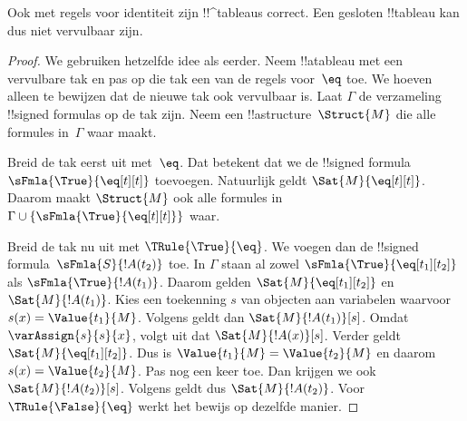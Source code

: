 \documentclass[openany]{memoir}
\begin{document}
\begingroup
\def\olfilename{OLP-0111}
\def\olfilepath{content/first-order-logic/tableaux/}
\hypertarget{unit-OLP-0111}{}





\begin{prop}
Ook met regels voor identiteit zijn !!^{tableau}s correct. Een gesloten
!!{tableau} kan dus niet vervulbaar zijn.
\end{prop}

\begin{proof}
We gebruiken hetzelfde idee als eerder. Neem !!a{tableau} met een
vervulbare tak en pas op die tak een van de regels voor~$\eq$ toe. We
hoeven alleen te bewijzen dat de nieuwe tak ook vervulbaar is. Laat
$\Gamma$ de verzameling !!{signed formula}s op de tak zijn. Neem een
!!a{structure}~$\Struct{M}$ die alle formules in~$\Gamma$ waar maakt.

Breid de tak eerst uit met~$\eq$. Dat betekent dat we de
!!{signed formula}~$\sFmla{\True}{\eq[t][t]}$ toevoegen. Natuurlijk
geldt $\Sat{M}{\eq[t][t]}$. Daarom maakt $\Struct{M}$ ook alle formules
in $\Gamma \cup \{\sFmla{\True}{\eq[t][t]}\}$ waar.

Breid de tak nu uit met $\TRule{\True}{\eq}$. We voegen dan de
!!{signed formula}~$\sFmla{S}{!A(t_2)}$ toe. In $\Gamma$ staan al
zowel $\sFmla{\True}{\eq[t_1][t_2]}$ als
$\sFmla{\True}{!A(t_1)}$. Daarom gelden
$\Sat{M}{\eq[t_1][t_2]}$ en $\Sat{M}{!A(t_1)}$. Kies een toekenning
$s$ van objecten aan variabelen waarvoor
$s(x) = \Value{t_1}{M}$. Volgens
 geldt dan
$\Sat{M}{!A(t_1)}[s]$. Omdat $\varAssign{s}{s}{x}$, volgt uit
 dat $\Sat{M}{!A(x)}[s]$. Verder
geldt $\Sat{M}{\eq[t_1][t_2]}$. Dus is
$\Value{t_1}{M} = \Value{t_2}{M}$ en daarom
$s(x) = \Value{t_2}{M}$. Pas
 nog een keer toe. Dan krijgen we
ook $\Sat{M}{!A(t_2)}[s]$. Volgens
 geldt dus
$\Sat{M}{!A(t_2)}$. Voor $\TRule{\False}{\eq}$ werkt het bewijs op
dezelfde manier.
\end{proof}
\endgroup
\OLEndChapterHook
\end{document}
